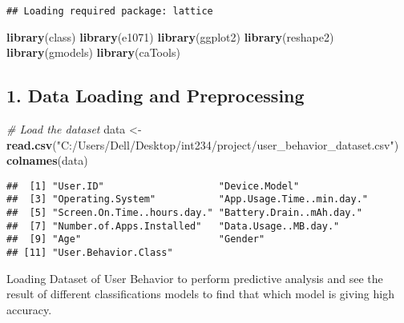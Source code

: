 \documentclass[
]{article}
\newenvironment{Shaded}{\begin{snugshade}}{\end{snugshade}}
\newcommand{\CommentTok}[1]{\textcolor[rgb]{0.56,0.35,0.01}{\textit{#1}}}
\newcommand{\FunctionTok}[1]{\textcolor[rgb]{0.13,0.29,0.53}{\textbf{#1}}}
\newcommand{\NormalTok}[1]{#1}
\newcommand{\OtherTok}[1]{\textcolor[rgb]{0.56,0.35,0.01}{#1}}
\newcommand{\SpecialCharTok}[1]{\textcolor[rgb]{0.81,0.36,0.00}{\textbf{#1}}}
\newcommand{\StringTok}[1]{\textcolor[rgb]{0.31,0.60,0.02}{#1}}
\begin{document}
\begin{verbatim}
## Loading required package: lattice
\end{verbatim}

\begin{Shaded}
\begin{Highlighting}[]
\FunctionTok{library}\NormalTok{(class)}
\FunctionTok{library}\NormalTok{(e1071)}
\FunctionTok{library}\NormalTok{(ggplot2)}
\FunctionTok{library}\NormalTok{(reshape2)}
\FunctionTok{library}\NormalTok{(gmodels)}
\FunctionTok{library}\NormalTok{(caTools)}
\end{Highlighting}
\end{Shaded}

\subsection{1. Data Loading and
Preprocessing}\label{data-loading-and-preprocessing}

\begin{Shaded}
\begin{Highlighting}[]
\CommentTok{\# Load the dataset}
\NormalTok{data }\OtherTok{\textless{}{-}} \FunctionTok{read.csv}\NormalTok{(}\StringTok{"C:/Users/Dell/Desktop/int234/project/user\_behavior\_dataset.csv"}\NormalTok{)}
\FunctionTok{colnames}\NormalTok{(data)}
\end{Highlighting}
\end{Shaded}

\begin{verbatim}
##  [1] "User.ID"                    "Device.Model"              
##  [3] "Operating.System"           "App.Usage.Time..min.day."  
##  [5] "Screen.On.Time..hours.day." "Battery.Drain..mAh.day."   
##  [7] "Number.of.Apps.Installed"   "Data.Usage..MB.day."       
##  [9] "Age"                        "Gender"                    
## [11] "User.Behavior.Class"
\end{verbatim}

Loading Dataset of User Behavior to perform predictive analysis and see
the result of different classifications models to find that which model
is giving high accuracy.

\begin{Shaded}
\end{Shaded}
\end{document}
